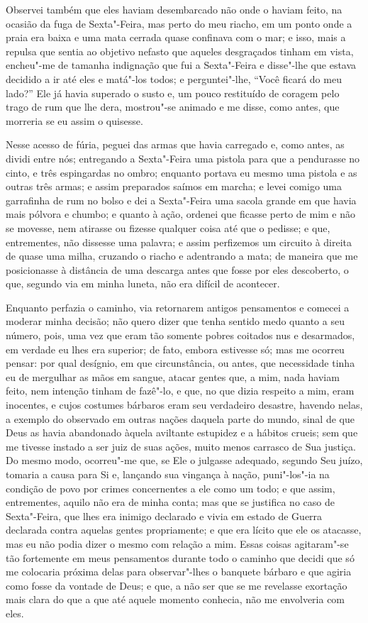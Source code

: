 Observei também que eles haviam desembarcado não onde o haviam feito, na
ocasião da fuga de Sexta"-Feira, mas perto do meu riacho, em um ponto
onde a praia era baixa e uma mata cerrada quase confinava com o mar; e
isso, mais a repulsa que sentia ao objetivo nefasto que aqueles
desgraçados tinham em vista, encheu"-me de tamanha indignação que fui a
Sexta"-Feira e disse"-lhe que estava decidido a ir até eles e matá"-los
todos; e perguntei"-lhe, ``Você ficará do meu lado?'' Ele já havia
superado o susto e, um pouco restituído de coragem pelo trago de rum que
lhe dera, mostrou"-se animado e me disse, como antes, que morreria se eu
assim o quisesse.

Nesse acesso de fúria, peguei das armas que havia carregado e, como
antes, as dividi entre nós; entregando a Sexta"-Feira uma pistola para
que a pendurasse no cinto, e três espingardas no ombro; enquanto portava
eu mesmo uma pistola e as outras três armas; e assim preparados saímos
em marcha; e levei comigo uma garrafinha de rum no bolso e dei a
Sexta"-Feira uma sacola grande em que havia mais pólvora e chumbo; e
quanto à ação, ordenei que ficasse perto de mim e não se movesse, nem
atirasse ou fizesse qualquer coisa até que o pedisse; e que,
entrementes, não dissesse uma palavra; e assim perfizemos um circuito à
direita de quase uma milha, cruzando o riacho e adentrando a mata; de
maneira que me posicionasse à distância de uma descarga antes que fosse
por eles descoberto, o que, segundo via em minha luneta, não era difícil
de acontecer.

Enquanto perfazia o caminho, via retornarem antigos pensamentos e
comecei a moderar minha decisão; não quero dizer que tenha sentido medo
quanto a seu número, pois, uma vez que eram tão somente pobres coitados
nus e desarmados, em verdade eu lhes era superior; de fato, embora
estivesse só; mas me ocorreu pensar: por qual desígnio, em que
circunstância, ou antes, que necessidade tinha eu de mergulhar as mãos
em sangue, atacar gentes que, a mim, nada haviam feito, nem intenção
tinham de fazê"-lo, e que, no que dizia respeito a mim, eram inocentes, e
cujos costumes bárbaros eram seu verdadeiro desastre, havendo nelas, a
exemplo do observado em outras nações daquela parte do mundo, sinal de
que Deus as havia abandonado àquela aviltante estupidez e a hábitos
crueis; sem que me tivesse instado a ser juiz de suas ações, muito menos
carrasco de Sua justiça. Do mesmo modo, ocorreu"-me que, se Ele o
julgasse adequado, segundo Seu juízo, tomaria a causa para Si e,
lançando sua vingança à nação, puni"-los"-ia na condição de povo por
crimes concernentes a ele como um todo; e que assim, entrementes, aquilo
não era de minha conta; mas que se justifica no caso de Sexta"-Feira, que
lhes era inimigo declarado e vivia em estado de Guerra declarada contra
aquelas gentes propriamente; e que era lícito que ele os atacasse, mas
eu não podia dizer o mesmo com relação a mim. Essas coisas agitaram"-se
tão fortemente em meus pensamentos durante todo o caminho que decidi que
só me colocaria próxima delas para observar"-lhes o banquete bárbaro e
que agiria como fosse da vontade de Deus; e que, a não ser que se me
revelasse exortação mais clara do que a que até aquele momento conhecia,
não me envolveria com eles.

